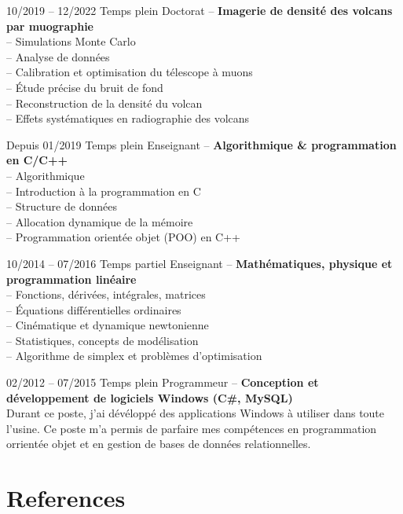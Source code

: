 \documentclass[
	10pt,
]{FreemanCV}
\begin{document}
\begin{paracol}{2}
\jobentry
	{10/2019 -- 12/2022}
	{Temps plein}
	{Doctorat -- \uca}
	{}
	{\textbf{Imagerie de densit\'e des volcans par muographie}}\\
	{
	-- Simulations Monte Carlo\\
	-- Analyse de données\\
	-- Calibration et optimisation du télescope à muons\\
	-- Étude précise du bruit de fond\\
	-- Reconstruction de la densité du volcan\\
	-- Effets systématiques en radiographie des volcans
	}
\medskip
\medskip

\jobentry
	{Depuis 01/2019}
	{Temps plein}
	{Enseignant -- \ueh}
	{}
	{\textbf{Algorithmique \& programmation en C/C++}}\\
	{
	-- Algorithmique\\
	-- Introduction à la programmation en C\\
	-- Structure de données\\
	-- Allocation dynamique de la mémoire\\
	-- Programmation orientée objet (POO) en C++
	}
\medskip
\medskip

\jobentry
	{10/2014 -- 07/2016}
	{Temps partiel}
	{Enseignant -- \unif}
	{}
	{\textbf{Math\'ematiques, physique et programmation lin\'eaire}}\\
	{
	-- Fonctions, d\'eriv\'ees, int\'egrales, matrices\\
	-- \'Equations diff\'erentielles ordinaires\\
	-- Cin\'ematique et dynamique newtonienne\\
	-- Statistiques, concepts de mod\'elisation\\
	-- Algorithme de simplex et problèmes d’optimisation
	}
\medskip
\medskip

\jobentry
	{02/2012 -- 07/2015}
	{Temps plein}
	{Programmeur -- \usjldd}
	{}
	{\textbf{Conception et d\'eveloppement de logiciels Windows (C\#, MySQL)}}\\
	{
		Durant ce poste, j'ai d\'ev\'elopp\'e des applications Windows \`a utiliser dans toute l'usine. Ce poste m'a permis de parfaire mes comp\'etences en programmation orrient\'ee objet et en gestion de bases de donn\'ees relationnelles.
	}
\medskip
\medskip


\section{References}


\end{paracol}
\end{document}
